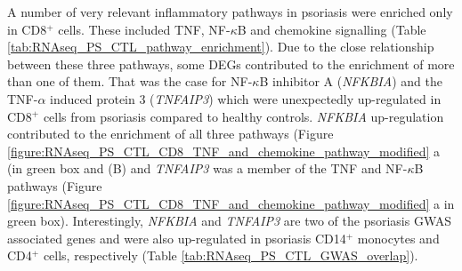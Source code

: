 A number of very relevant inflammatory pathways in psoriasis were enriched only in CD8$^+$ cells. These included TNF, NF-$\kappa$B and chemokine signalling (Table \ref{tab:RNAseq_PS_CTL_pathway_enrichment}). Due to the close relationship between these three pathways, some DEGs contributed to the enrichment of more than one of them. That was the case for NF-$\kappa$B inhibitor A (\textit{NFKBIA}) and the TNF-$\alpha$ induced protein 3 (\textit{TNFAIP3}) which were unexpectedly up-regulated in CD8$^+$ cells from psoriasis compared to healthy controls. \textit{NFKBIA} up-regulation contributed to the enrichment of all three pathways (Figure \ref{figure:RNAseq_PS_CTL_CD8_TNF_and_chemokine_pathway_modified} a (in green box and (B) and \textit{TNFAIP3} was a member of the TNF and NF-$\kappa$B pathways (Figure \ref{figure:RNAseq_PS_CTL_CD8_TNF_and_chemokine_pathway_modified} a in green box). Interestingly, \textit{NFKBIA} and \textit{TNFAIP3} are two of the psoriasis GWAS associated genes and were also up-regulated in psoriasis CD14$^+$ monocytes and CD4$^+$ cells, respectively (Table \ref{tab:RNAseq_PS_CTL_GWAS_overlap}).



